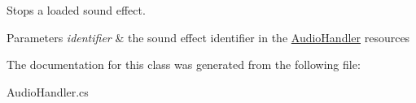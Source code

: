 Stops a loaded sound effect. 


\begin{DoxyParams}{Parameters}
{\em identifier} & the sound effect identifier in the \hyperlink{classwp__engine_1_1_audio_handler}{Audio\-Handler} resources \\
\hline
\end{DoxyParams}


The documentation for this class was generated from the following file\-:\begin{DoxyCompactItemize}
\item 
Audio\-Handler.\-cs\end{DoxyCompactItemize}
